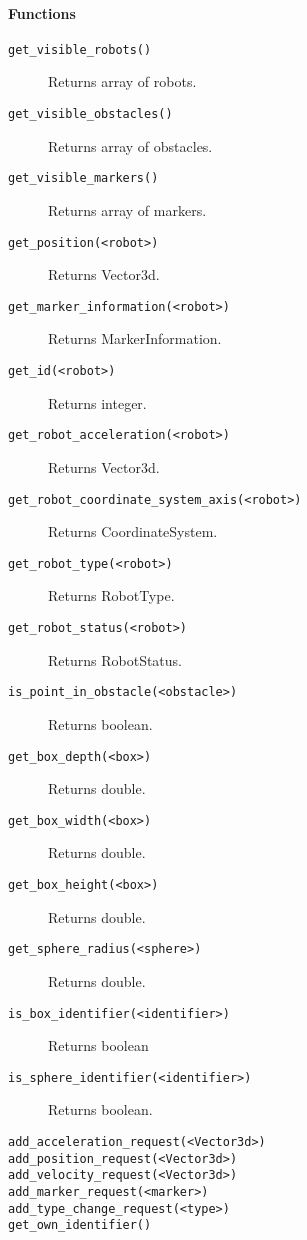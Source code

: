 \documentclass[a4paper,halfparskip,11pt,twoside]{scrartcl}
\begin{document}
\paragraph{\Lua Functions}
\begin{description}
	\item [\texttt{get\_visible\_robots()}] Returns array of robots.
	\item [\texttt{get\_visible\_obstacles()}] Returns array of obstacles.
	\item [\texttt{get\_visible\_markers()}] Returns array of markers.
	\item [\texttt{get\_position(<robot>)}] Returns Vector3d.
	\item [\texttt{get\_marker\_information(<robot>)}] Returns MarkerInformation.
	\item [\texttt{get\_id(<robot>)}] Returns integer.
	\item [\texttt{get\_robot\_acceleration(<robot>)}] Returns Vector3d.
	\item [\texttt{get\_robot\_coordinate\_system\_axis(<robot>)}] Returns CoordinateSystem.
	\item [\texttt{get\_robot\_type(<robot>)}] Returns RobotType.
	\item [\texttt{get\_robot\_status(<robot>)}] Returns RobotStatus.
	\item [\texttt{is\_point\_in\_obstacle(<obstacle>)}] Returns boolean.
	\item [\texttt{get\_box\_depth(<box>)}] Returns double.
	\item [\texttt{get\_box\_width(<box>)}] Returns double.
	\item [\texttt{get\_box\_height(<box>)}] Returns double.
	\item [\texttt{get\_sphere\_radius(<sphere>)}] Returns double.
	\item [\texttt{is\_box\_identifier(<identifier>)}] Returns boolean
	\item [\texttt{is\_sphere\_identifier(<identifier>)}] Returns boolean.
	\item [\texttt{add\_acceleration\_request(<Vector3d>)}]
	\item [\texttt{add\_position\_request(<Vector3d>)}]
	\item [\texttt{add\_velocity\_request(<Vector3d>)}]
	\item [\texttt{add\_marker\_request(<marker>)}]
	\item [\texttt{add\_type\_change\_request(<type>)}]
	\item [\texttt{get\_own\_identifier()}]
\end{description}
\end{document}
